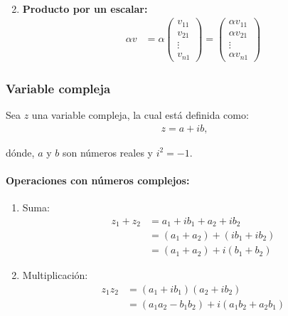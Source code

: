 \begin{enumerate}
\begin{align*}
    \end{align*}
    \item \textbf{Producto por un escalar:} \begin{align*}
        \alpha v &= \alpha \begin{pmatrix} v_{11} \\ v_{21} \\ \vdots \\ v_{n1} \end{pmatrix} = \begin{pmatrix} \alpha v_{11} \\ \alpha v_{21} \\ \vdots \\ \alpha v_{n1} \end{pmatrix}
    \end{align*}
\end{enumerate}


\subsubsection{Variable compleja}
\label{sec:1_1}

Sea $z$ una variable compleja, la cual está definida como: \begin{align}
    z = a + ib,
    \label{eq:1.1.3}
\end{align}

dónde, $a$ y $b$ son números reales y $i^2 = -1$.

\paragraph*{Operaciones con números complejos:}

\begin{enumerate}
    \item Suma: \begin{align*}
        z_1 + z_2 &= a_1 + ib_1 + a_2 + ib_2 \\
                    &= (a_1 + a_2) + (ib_1 + ib_2) \\
                    &= (a_1 + a_2) + i(b_1 + b_2)
    \end{align*}
    \item Multiplicación: \begin{align*}
        z_1 z_2 &= (a_1 + ib_1)(a_2 + ib_2) \\
                &= (a_1a_2 - b_1b_2) + i(a_1b_2 + a_2b_1)
    \end{align*}
\end{enumerate}

